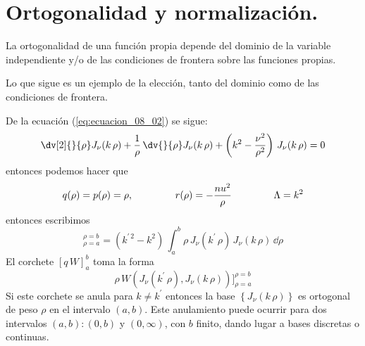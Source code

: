 \section{Ortogonalidad y normalización.}
La ortogonalidad de una función propia depende del dominio de la variable independiente y/o de las condiciones de frontera sobre las funciones propias.
\par
Lo que sigue es un ejemplo de la elección, tanto del dominio como de las condiciones de frontera.
\par
De la ecuación (\ref{eq:ecuacion_08_02}) se sigue:
\[ \dv[2]{}{\rho} J_{\nu} (k \, \rho) + \dfrac{1}{\rho} \, \dv{}{\rho} J_{\nu} (k \, \rho) + \left( k^{2} - \dfrac{\nu^{2}}{\rho^{2}} \right) \, J_{\nu} (k \, \rho) = 0\]
entonces podemos hacer que
\[ q(\rho) = p(\rho) = \rho, \hspace{1.5cm} r(\rho) = -\dfrac{nu^{2}}{\rho} \hspace{1.5cm} \Lambda = k^{2} \]
entonces escribimos
\begin{equation}
[ \rho \, W(J_{\nu}(k^{\prime} \, \rho), J_{\nu} (k \, \rho))]_{\rho=a}^{\rho=b} = (k^{\prime \, 2} - k^{2}) \, \int_{a}^{b} \rho \, J_{\nu}(k^{\prime} \, \rho) \, J_{\nu} (k \, \rho) \, \dd \rho
\label{eq:ecuacion_08_12}
\end{equation}
El corchete $[q \, W]_{a}^{b}$ toma la forma
\[ \rho \, W(J_{\nu}(k^{\prime} \, \rho), J_{\nu} (k \, \rho))]_{\rho=a}^{\rho=b} \]
Si este corchete se anula para $k \neq k^{\prime}$ entonces la base $\left\{ J_{\nu} (k \, \rho) \right\}$ es ortogonal de peso $\rho$ en el intervalo $(a,b)$. Este anulamiento puede ocurrir para dos intervalos $(a,b): (0, b)$ y $(0, \infty)$, con $b$ finito, dando lugar a bases discretas o continuas.
